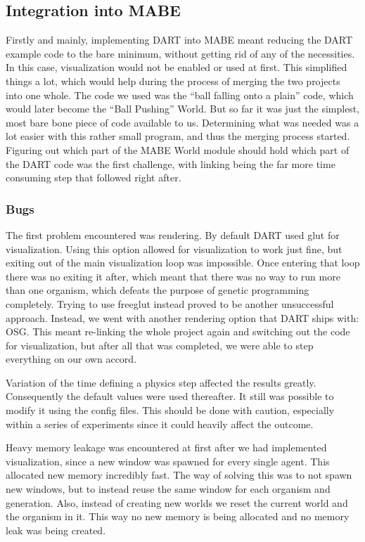 \documentclass[12pt,oneside,listof=totoc,paper=a4,headings=small]{scrbook}
\begin{document}
\subsection{Integration into MABE}
Firstly and mainly, implementing DART into MABE meant reducing the DART example code to the bare minimum, without getting rid of any of the necessities. 
In this case, visualization would not be enabled or used at first. This simplified things a lot, which would help during the process of merging the two projects into one whole. The code we used was the ``ball falling onto a plain'' code, which would later become the ``Ball Pushing'' World. But so far it was just the simplest, most bare bone piece of code available to us. 
Determining what was needed was a lot easier with this rather small program, and thus the merging process started. Figuring out which part of the MABE World module should hold which part of the DART code was the first challenge, with linking being the far more time consuming step that followed right after. 

\subsubsection{Bugs}
The first problem encountered was rendering. By default DART used glut for visualization. Using this option allowed for visualization to work just fine, but exiting out of the main visualization loop was impossible. Once entering that loop there was no exiting it after, which meant that there was no way to run more than one organism, which defeats the purpose of genetic programming completely. Trying to use freeglut instead proved to be another unsuccessful approach. Instead, we went with another rendering option that DART ships with: OSG. This meant re-linking the whole project again and switching out the code for visualization, but after all that was completed, we were able to step everything on our own accord.

Variation of the time defining a physics step affected the results greatly. Consequently the default values were used thereafter. It still was possible to modify it using the config files. This should be done with caution, especially within a series of experiments since it could heavily affect the outcome. 

Heavy memory leakage was encountered at first after we had implemented visualization, since a new window was spawned for every single agent. This allocated new memory incredibly fast. The way of solving this was to not spawn new windows, but to instead reuse the same window for each organism and generation. Also, instead of creating new worlds we reset the current world and the organism in it. This way no new memory is being allocated and no memory leak was being created. 
\end{document}
